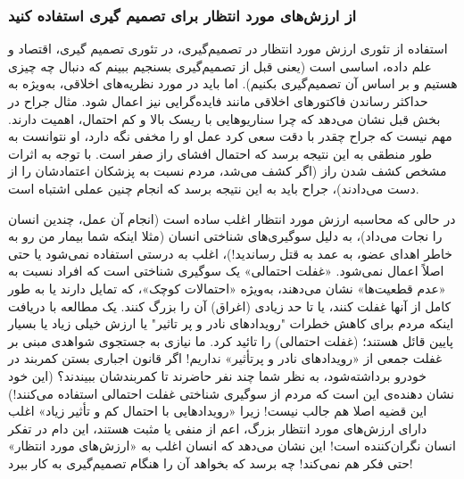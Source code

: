 

\subsubsection*{از ارزش‌های مورد انتظار برای تصمیم گیری استفاده کنید}
استفاده از تئوری ارزش مورد انتظار در تصمیم‌گیری، در تئوری تصمیم گیری، اقتصاد و علم داده، اساسی است (یعنی قبل از تصمیم‌گیری بسنجیم ببینم که دنبال چه چیزی هستیم و بر اساس آن تصمیم‌گیری بکنیم).
اما باید در مورد نظریه‌های اخلاقی، به‌ویژه به حداکثر رساندن فاکتورهای اخلاقی مانند فایده‌گرایی نیز اعمال شود.
مثال جراح در بخش قبل نشان می‌دهد که چرا سناریوهایی با ریسک بالا و کم احتمال، اهمیت دارند.
مهم نیست که جراح چقدر با دقت سعی کرد عمل او را مخفی نگه دارد، او نتوانست به طور منطقی به این نتیجه برسد که احتمال افشای راز صفر است.
با توجه به اثرات مشخص کشف شدن راز (اگر کشف می‌شد، مردم نسبت به پزشکان اعتمادشان را از دست می‌دادند)، جراح باید به این نتیجه برسد که انجام چنین عملی اشتباه است.

در حالی که محاسبه ارزش مورد انتظار اغلب ساده است (انجام آن عمل، چندین انسان را نجات می‌داد)، به دلیل سوگیری‌های شناختی انسان (مثلا اینکه شما بیمار من رو به خاطر اهدای عضو، به عمد به قتل رساندید!)، اغلب به درستی استفاده نمی‌شود یا حتی اصلاً اعمال نمی‌شود.
«غفلت احتمالی» یک سوگیری شناختی است که افراد نسبت به «عدم قطعیت‌ها» نشان می‌دهند، به‌ویژه «احتمالات کوچک»، که تمایل دارند یا به طور کامل از آنها غفلت کنند، یا تا حد زیادی (اغراق) آن را بزرگ کنند.
یک مطالعه با دریافت اینکه مردم برای کاهش خطرات "رویدادهای نادر و پر تاثیر" یا ارزش خیلی زیاد یا بسیار پایین قائل هستند؛ (غفلت احتمالی) را تائید کرد.
ما نیازی به جستجوی شواهدی مبنی بر غفلت جمعی از «رویدادهای نادر و پرتأثیر» نداریم!
اگر قانون اجباری بستن کمربند در خودرو برداشته‌شود، به نظر شما چند نفر حاضرند تا کمربندشان ببیندند؟ (این خود نشان دهنده‌ی این است که مردم از سوگیری شناختی غفلت احتمالی استفاده می‌کنند!) این قضیه اصلا هم جالب نیست!
زیرا «رویدادهایی با احتمال کم و تأثیر زیاد» اغلب دارای ارزش‌های مورد انتظار بزرگ، اعم از منفی یا مثبت هستند، این دام در تفکر انسان نگران‌کننده است!
این نشان می‌دهد که انسان اغلب به «ارزش‌های مورد انتظار» حتی فکر هم نمی‌کند!
چه برسد که بخواهد آن را هنگام تصمیم‌گیری به کار ببرد!

